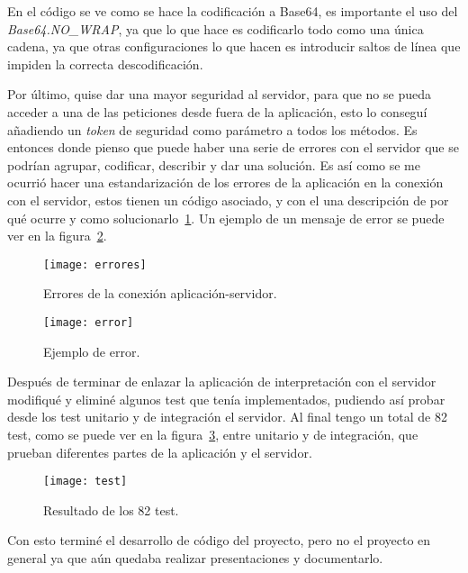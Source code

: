 En el código se ve como se hace la codificación a Base64, es importante el uso del \textit{Base64.NO\_WRAP}, ya que lo que hace es codificarlo todo como una única cadena, ya que otras configuraciones lo que hacen es introducir saltos de línea que impiden la correcta descodificación.

Por último, quise dar una mayor seguridad al servidor, para que no se pueda acceder a una de las peticiones desde fuera de la aplicación, esto lo conseguí añadiendo un \textit{token} de seguridad como parámetro a todos los métodos. Es entonces donde pienso que puede haber una serie de errores con el servidor que se podrían agrupar, codificar, describir y dar una solución. Es así como se me ocurrió hacer una estandarización de los errores de la aplicación en la conexión con el servidor, estos tienen un código asociado, y con el una descripción de por qué ocurre y como solucionarlo~\ref{fig:errores}. Un ejemplo de un mensaje de error se puede ver en la figura~\ref{fig:error}.
	
\begin{figure}
	\centering
	\texttt{[image: errores]}
	\caption{Errores de la conexión aplicación-servidor.}
	\label{fig:errores}
\end{figure}

\begin{figure}
	\centering
	\texttt{[image: error]}
	\caption{Ejemplo de error.}
	\label{fig:error}
\end{figure}

Después de terminar de enlazar la aplicación de interpretación con el servidor modifiqué y eliminé algunos test que tenía implementados, pudiendo así probar desde los test unitario y de integración el servidor. Al final tengo un total de 82 test, como se puede ver en la figura~\ref{fig:test}, entre unitario y de integración, que prueban diferentes partes de la aplicación y el servidor.

\begin{figure}
	\centering
	\texttt{[image: test]}
	\caption{Resultado de los 82 test.}
	\label{fig:test}
\end{figure}

Con esto terminé el desarrollo de código del proyecto, pero no el proyecto en general ya que aún quedaba realizar presentaciones y documentarlo.

